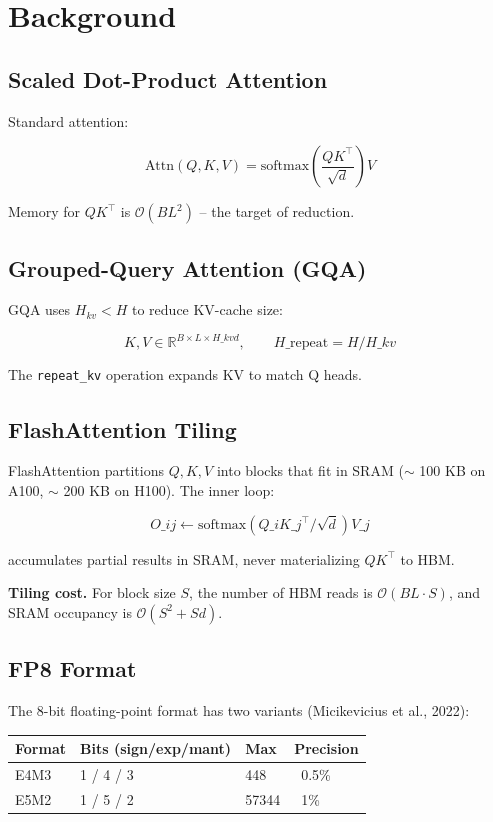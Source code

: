 
\section{Background}

\subsection{Scaled Dot-Product Attention}

Standard attention:

\[
\text{Attn}(Q, K, V) = \text{softmax}\!\left(\frac{Q K^\top}{\sqrt{d}}\right) V
\tag{3.1}
\]

Memory for $QK^\top$ is $\mathcal{O}(BL^2)$ -- the target of reduction.

\subsection{Grouped-Query Attention (GQA)}

GQA uses $H_{kv} < H$ to reduce KV-cache size:

\[
K, V \in \mathbb{R}^{B \times L \times H\_{kv} d}, \qquad
H\_{\text{repeat}} = H / H\_{kv}
\tag{3.2}
\]

The \texttt{repeat\_kv} operation expands KV to match Q heads.

\subsection{FlashAttention Tiling}

FlashAttention partitions $Q, K, V$ into blocks that fit in SRAM ($\sim$ 100 KB 
on A100, $\sim$ 200 KB on H100). The inner loop:

\[
O\_{ij} \leftarrow \text{softmax}(Q\_i K\_j^\top / \sqrt{d}) V\_j
\tag{3.3}
\]

accumulates partial results in SRAM, never materializing $QK^\top$ to HBM.

\textbf{Tiling cost.} For block size $S$, the number of HBM reads is 
$\mathcal{O}(BL \cdot S)$, and SRAM occupancy is $\mathcal{O}(S^2 + Sd)$.

\subsection{FP8 Format}

The 8-bit floating-point format has two variants (Micikevicius et al., 2022):

\begin{table}[H]
\centering
\small
\begin{tabular}{llll}
\toprule
\textbf{Format} & \textbf{Bits (sign/exp/mant)} & \textbf{Max} & \textbf{Precision} \\
\midrule
E4M3 & 1 / 4 / 3 & 448 & ~0.5\% \\
E5M2 & 1 / 5 / 2 & 57344 & ~1\% \\
\bottomrule
\end{tabular}
\end{table}

